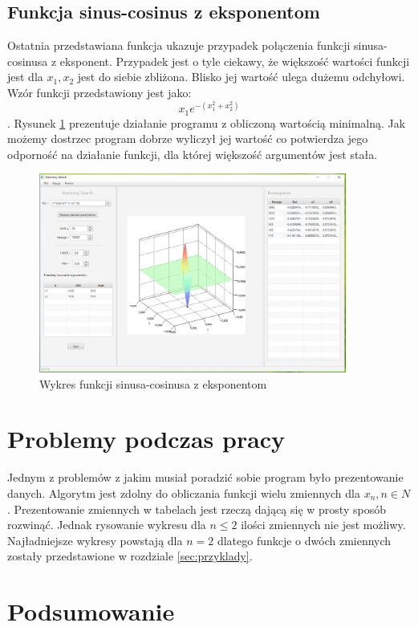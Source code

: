 \documentclass[10pt, a4paper]{article}
\begin{document}
\subsection{Funkcja sinus-cosinus z eksponentom}
\label{subsec:sinexp}
Ostatnia przedstawiana funkcja ukazuje przypadek połączenia funkcji sinusa-cosinusa z eksponent. Przypadek jest o tyle ciekawy, że większość wartości funkcji jest dla {\em $x_{1}, x_{2}$} jest do siebie zbliżona. Blisko jej wartość ulega dużemu odchyłowi.  Wzór funkcji przedstawiony jest jako: $$x_{1}e^{-(x_{1}^{2}+x_{2}^2)}$$. Rysunek \ref{fig:6} prezentuje działanie programu z obliczoną wartością minimalną. Jak możemy dostrzec program dobrze wyliczył jej wartość co potwierdza jego odporność na działanie funkcji, dla której większość argumentów jest stała. 
\begin{figure}[htbp]
	\centering
	\includegraphics[width=0.90\textwidth]{images/5.PNG}
	\caption{Wykres funkcji sinusa-cosinusa z eksponentom}
	\label{fig:6}
\end{figure}

\section{Problemy podczas pracy}
\label{sec:problemy}
Jednym z problemów z jakim musiał poradzić sobie program było prezentowanie danych. Algorytm jest zdolny do obliczania funkcji wielu zmiennych dla {\em $x_{n} , n \in N$}. Prezentowanie zmiennych w tabelach jest rzeczą dającą się w prosty sposób rozwinąć. Jednak rysowanie wykresu dla $n \leq 2$ ilości zmiennych nie jest możliwy. Najładniejsze wykresy powstają dla $n = 2$ dlatego funkcje o dwóch zmiennych zostały przedstawione w rozdziale \ref{sec:przyklady}. \\

\section{Podsumowanie}
\label{sec:podsumowanie}


\newpage
{}


\end{document}
